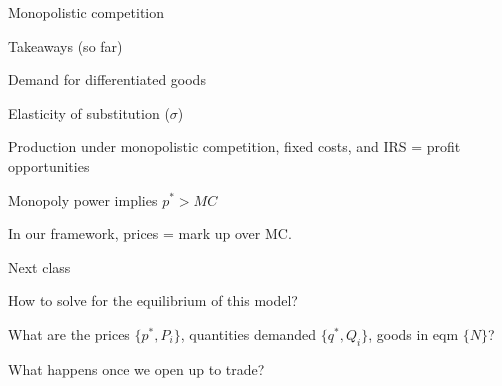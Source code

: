 \documentclass[notes,11pt, aspectratio=169, xcolor=table]{beamer}
\newenvironment{wideitemize}{\itemize\addtolength{\itemsep}{10pt}}{\enditemize}
\begin{document}
\begin{frame}{Monopolistic competition}

 \end{frame}

\begin{frame}{Takeaways (so far)}
\begin{wideitemize}
    \item Demand for differentiated goods
    \item Elasticity of substitution ($\sigma$)
    \item Production under monopolistic competition, fixed costs, and IRS = profit opportunities
    \item Monopoly power implies $p^* > MC$
    \item In our framework, prices = mark up over MC.
    \end{wideitemize}
 \end{frame}

\begin{frame}{Next class}
\begin{wideitemize}
    \item How to solve for the equilibrium of this model?
    \item What are the prices $\{p^*, P_i\}$, quantities demanded $\{q^*,Q_i\}$, goods in eqm $\{N\}$?
    \item What happens once we open up to trade?
    \end{wideitemize}
 \end{frame}



\end{document}
